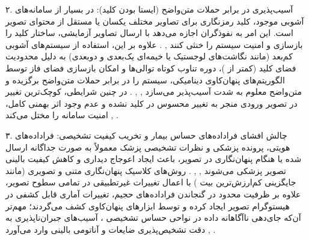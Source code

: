 

۲. آسیب‌پذیری در برابر حملات متن‌واضح (ایستا بودن کلید): در بسیار از سامانه‌های آشوبی موجود، کلید رمزنگاری برای تصاویر مختلف یکسان یا مستقل از محتوای تصویر است. این امر به نفوذگران اجازه می‌دهد با ارسال تصاویر آزمایشی، ساختار کلید را بازسازی و امنیت سیستم را خنثی کنند , . علاوه بر این، استفاده از سیستم‌های آشوبی کم‌بعد (مانند نگاشت‌های لوجستیک یا خیمه‌ای یک‌بعدی و دوبعدی) به دلیل محدودیت فضای کلید (کمتر از )، دوره تناوب کوتاه توالی‌ها و امکان بازسازی فضای فاز  توسط الگوریتم‌های پنهان‌کاوی دینامیکی، سیستم را در برابر حملات متن‌واضح برگزیده  و متن‌واضح معلوم  به شدت آسیب‌پذیر می‌سازد , , . در چنین شرایطی، کوچک‌ترین تغییر در تصویر ورودی منجر به تغییر محسوس در کلید نشده و عدم وجود اثر بهمنی  کامل، امنیت سامانه را مختل می‌کند , .\par



۳. چالش افشای فراداده‌های حساس بیمار و تخریب کیفیت تشخیصی: فراداده‌های هویتی، پرونده پزشکی و نظرات تشخیصی پزشک معمولاً به صورت جداگانه ارسال شده یا هنگام پنهان‌نگاری در تصویر، باعث ایجاد اعوجاج دیداری و کاهش کیفیت بالینی تصویر پزشکی می‌شوند , , . روش‌های کلاسیک پنهان‌نگاری متنی و تصویری (مانند جایگزینی کم‌ارزش‌ترین بیت ) با اعمال تغییرات غیرتطبیقی در تمامی سطوح تصویر، علاوه بر ظرفیت محدود در گنجاندن فراداده‌های حجیم، تغییرات آماری قابل کشفی در هیستوگرام تصویر ایجاد کرده و توسط ابزارهای پنهان‌کاوی  کشف می‌گردند؛ مهم‌تر آن‌که جای‌دهی ناآگاهانه داده در نواحی حساس تشخیصی ، آسیب‌های جبران‌ناپذیری به دقت تشخیص‌پذیری ضایعات و آناتومی بالینی وارد می‌آورد , .\par



